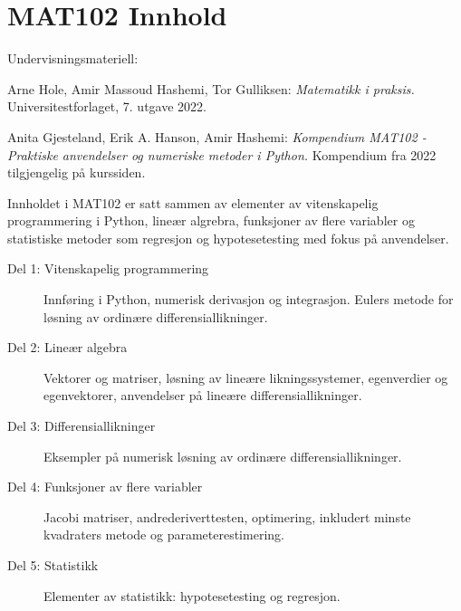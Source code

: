 \documentclass[12pt]{article}
\begin{document}
\section*{MAT102 Innhold}

Undervisningsmateriell:

\vspace{2mm}

Arne Hole, Amir Massoud Hashemi, Tor Gulliksen: {\em Matematikk i praksis.} Universitestforlaget, 7. utgave 2022.

\vspace{2mm}

Anita Gjesteland, Erik A. Hanson, Amir Hashemi: {\em Kompendium MAT102 - Praktiske anvendelser og numeriske metoder i Python.} Kompendium fra 2022 tilgjengelig på kurssiden.


\vspace{2mm}

Innholdet i MAT102 er satt sammen av elementer av vitenskapelig programmering i Python,
lineær algrebra, funksjoner av flere variabler og statistiske metoder som regresjon og hypotesetesting med
fokus på anvendelser.

\begin{description}
  \item[Del 1: Vitenskapelig programmering] Innføring i Python, numerisk derivasjon og integrasjon. Eulers metode for løsning av ordinære differensiallikninger.
  \item[Del 2: Lineær algebra] Vektorer og matriser, løsning av lineære likningssystemer, egenverdier og egenvektorer, anvendelser på lineære differensiallikninger.
  \item[Del 3: Differensiallikninger] Eksempler på numerisk løsning av ordinære differensiallikninger.
  \item[Del 4: Funksjoner av flere variabler] Jacobi matriser, andrederiverttesten, optimering, inkludert minste kvadraters metode og parameterestimering.
  \item[Del 5: Statistikk] Elementer av statistikk: hypotesetesting og regresjon.
\end{description}
\end{document}
